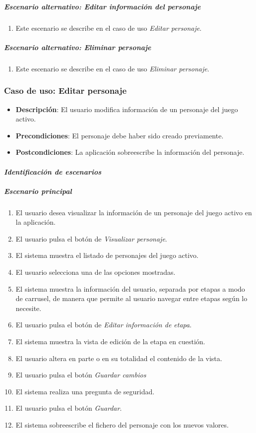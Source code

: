 \subparagraph{Escenario alternativo: Editar información del personaje}
\begin{enumerate}
    \item Este escenario se describe en el caso de uso \textit{Editar personaje}.
\end{enumerate}

\subparagraph{Escenario alternativo: Eliminar personaje}
\begin{enumerate}
    \item Este escenario se describe en el caso de uso \textit{Eliminar personaje}.
\end{enumerate}

\subsubsection{Caso de uso: Editar personaje}
\begin{itemize}
    \item \textbf{Descripción}: El usuario modifica información de un personaje del juego activo.
    \item \textbf{Precondiciones}: El personaje debe haber sido creado previamente.
    \item \textbf{Postcondiciones}: La aplicación sobreescribe la información del personaje.
\end{itemize}

\newpage
\paragraph{\textit{Identificación de escenarios}}
\subparagraph{Escenario principal}
\begin{enumerate}
    \item El usuario desea visualizar la información de un personaje del juego activo en la aplicación.
    \item El usuario pulsa el botón de \textit{Visualizar personaje}.
    \item El sistema muestra el listado de personajes del juego activo.
    \item El usuario selecciona una de las opciones mostradas.
    \item El sistema muestra la información del usuario, separada por etapas a modo de carrusel, de manera 
    que permite al usuario navegar entre etapas según lo necesite.
    \item El usuario pulsa el botón de \textit{Editar información de etapa}.
    \item El sistema muestra la vista de edición de la etapa en cuestión.
    \item El usuario altera en parte o en su totalidad el contenido de la vista.
    \item El usuario pulsa el botón \textit{Guardar cambios}
    \item El sistema realiza una pregunta de seguridad.
    \item El usuario pulsa el botón \textit{Guardar}.
    \item El sistema sobreescribe el fichero del personaje con los nuevos valores.
\end{enumerate}

